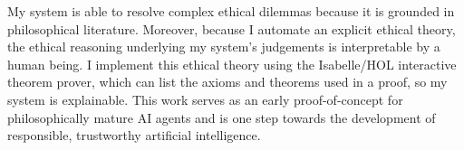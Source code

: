 \begin{isabellebody}
\begin{isamarkuptext}
My system is able to resolve complex ethical dilemmas because it is grounded in philosophical literature.
Moreover, because I automate an explicit ethical theory, the ethical reasoning underlying my system's judgements
is interpretable by a human being. I implement this ethical theory using the Isabelle/HOL interactive theorem prover, which can 
list the axioms and theorems used in a proof, so my system is explainable. This work serves as an early 
proof-of-concept for philosophically mature AI agents and is one step towards the development of 
responsible, trustworthy artificial intelligence.%
\end{isamarkuptext}\isamarkuptrue%
%
\isadelimtheory
%
\endisadelimtheory
%
\isatagtheory
%
\endisatagtheory
{\isafoldtheory}%
%
\isadelimtheory
%
\endisadelimtheory
%
\end{isabellebody}%
\endinput
